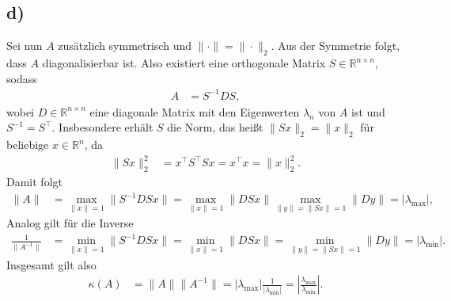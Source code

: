 \documentclass[english, parskip=full]{scrartcl}
\newcommand{\tecxt}{}
\begin{document}
\subsection*{d)}
Sei nun $A$ zusätzlich symmetrisch und $\|\cdot\| = \|\cdot\|_2$.
Aus der Symmetrie folgt, dass $A$ diagonalisierbar ist.
Also existiert eine orthogonale Matrix $S\in\mathbb{R}^{n\times n}$, sodass
\begin{align}
A &= S^{-1}DS,
\end{align}
wobei $D\in\mathbb{R}^{n\times n}$ eine diagonale Matrix mit den Eigenwerten $\lambda_n$ von $A$ ist und $S^{-1} = S^\top$.
Insbesondere erhält $S$ die Norm, das heißt $\|Sx\|_2 = \|x\|_2$ für beliebige $x\in\mathbb{R}^n$, da
\begin{align}
\|Sx\|_2^2 &= x^\top S^\top Sx = x^\top x = \|x\|_2^2.
\end{align}
Damit folgt
\begin{align}
\|A\| &= \max_{\|x\| = 1} \|S^{-1}DSx\| = \max_{\|x\| = 1} \|DSx\| \max_{\|y\| = \|Sx\| = 1} \|Dy\| = |\lambda_\tecxt\text{max}|,
\end{align}
Analog gilt für die Inverse
\begin{align}
\frac{1}{\|A^{-1}\|} &= \min_{\|x\| = 1} \|S^{-1}DSx\| = \min_{\|x\| = 1} \|DSx\| = \min_{\|y\| = \|Sx\| = 1} \|Dy\| = |\lambda_\tecxt\text{min}|.
\end{align}
Insgesamt gilt also
\begin{align}
\kappa (A) &= \|A\| \|A^{-1}\| = |\lambda_\tecxt\text{max}|\frac{1}{|\lambda_\tecxt\text{min}|} = \left\vert\frac{\lambda_\tecxt\text{max}}{\lambda_\tecxt\text{min}}\right\vert.
\end{align}
\end{document}
